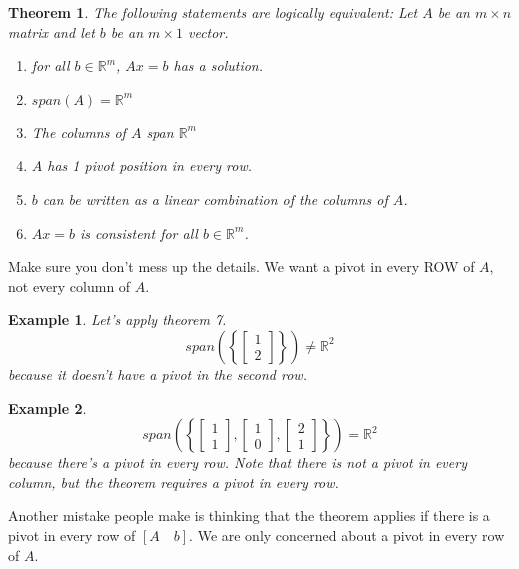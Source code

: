 \documentclass[11pt]{article}
\newtheorem{thm}{Theorem}
\newtheorem{ex}{Example}
\begin{document}
\begin{thm}
  The following statements are logically equivalent:
  Let $A$ be an $m \times n$ matrix and let $b$ be an $m \times 1$ vector.
  \begin{enumerate}
      \item for all $b \in \mathbb{R}^{m}$, $Ax = b$ has a solution.
      \item $span(A) = \mathbb{R}^{m}$
    \item The columns of $A$ span $\mathbb{R}^{m}$
      \item $A$ has 1 pivot position in every row.
      \item $b$ can be written as a linear combination of the columns of $A$.
      \item $Ax = b$ is consistent for all $b \in \mathbb{R}^{m}$.
  \end{enumerate}
\end{thm}

Make sure you don't mess up the details. We want a pivot in every ROW of $A$, not every column of $A$.
\begin{ex}
  Let's apply theorem 7.
  \[span\left(\left\{ \begin{bmatrix} 1 \\ 2 \end{bmatrix}\right\}\right) \neq \mathbb{R}^{2}\]
  because it doesn't have a pivot in the second row.
\end{ex}

\begin{ex}
  \[span\left(\left\{ \begin{bmatrix} 1 \\ 1 \end{bmatrix},\begin{bmatrix} 1 \\ 0 \end{bmatrix},\begin{bmatrix} 2 \\ 1 \end{bmatrix}\right\}\right) = \mathbb{R}^{2}\]
  because there's a pivot in every row.
  Note that there is not a pivot in every column, but the theorem requires a pivot in every row.
\end{ex}

Another mistake people make is thinking that the theorem applies if there is a pivot in every row of $\left [ A \quad b\right ]$. We are only concerned
about a pivot in every row of $A$.
\end{document}
